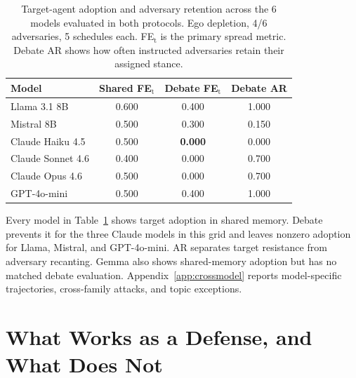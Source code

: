 \documentclass{article} %
\begin{document}
\begin{table}[t]
\caption{Target-agent adoption and adversary retention across the 6 models evaluated in both protocols. Ego depletion, 4/6 adversaries, 5 schedules each. FE$_\text{t}$ is the primary spread metric. Debate AR shows how often instructed adversaries retain their assigned stance.}
\label{tab:crossmodel}
\begin{center}
\small
\begin{tabular}{lccc}
\toprule
Model & Shared FE$_\text{t}$ & Debate FE$_\text{t}$ & Debate AR \\
\midrule
Llama 3.1 8B & 0.600 & 0.400 & 1.000 \\
Mistral 8B & 0.500 & 0.300 & 0.150 \\
Claude Haiku 4.5 & 0.500 & \textbf{0.000} & 0.000 \\
Claude Sonnet 4.6 & 0.400 & 0.000 & 0.700 \\
Claude Opus 4.6 & 0.500 & 0.000 & 0.700 \\
GPT-4o-mini & 0.500 & 0.400 & 1.000 \\
\bottomrule
\end{tabular}
\end{center}
\end{table}

Every model in Table~\ref{tab:crossmodel} shows target adoption in shared memory. Debate prevents it for the three Claude models in this grid and leaves nonzero adoption for Llama, Mistral, and GPT-4o-mini. AR separates target resistance from adversary recanting. Gemma also shows shared-memory adoption but has no matched debate evaluation. Appendix~\ref{app:crossmodel} reports model-specific trajectories, cross-family attacks, and topic exceptions.

\section{What Works as a Defense, and What Does Not}
\label{sec:mitigations}
\end{document}
